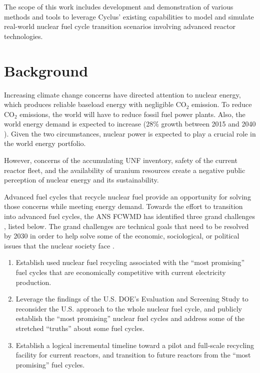 The scope of this work includes development and demonstration of
various methods and tools to leverage Cyclus' existing
capabilities to model and simulate real-world nuclear fuel cycle
transition scenarios involving advanced reactor technologies.


\section{Background}
Increasing climate change concerns have directed attention
to nuclear energy, which produces reliable baseload energy
with negligible CO$_2$ emission. To reduce CO$_2$ emissions,
the world will have to reduce fossil fuel power plants.
Also, the world energy demand is expected to increase
(28\% growth between 2015 and 2040 \cite{conti_international_2016}).
Given the two circumstances,
nuclear power is expected to play a crucial role in the world energy portfolio.

However, concerns of the accumulating \gls{UNF} inventory,
safety of the current reactor fleet, and the availability of
uranium resources create a negative public perception of
nuclear energy and its sustainability.

Advanced fuel cycles that recycle nuclear fuel 
provide an opportunity for solving those concerns while
meeting energy demand. Towards the effort to transition
into advanced fuel cycles, the \gls{ANS} \gls{FCWMD} has identified
three grand challenges \cite{huff_message_2017}, listed below. The grand
challenges are technical goals that need to be resolved by
2030 in order to help solve some of the economic, sociological,
or political issues that the nuclear society face \cite{american_nuclear_society_ans_2017}.

\begin{enumerate}
	\item Establish used nuclear fuel recycling associated with the
	``most promising'' fuel cycles that are economically competitive
	with current electricity production.
	\item Leverage the findings of the U.S. \gls{DOE}'s Evaluation
	and Screening Study to reconsider the U.S. approach to the whole
	nuclear fuel cycle, and publicly establish the ``most promising''
	nuclear fuel cycles and address some of the stretched ``truths''
	about some fuel cycles.
	\item Establish a logical incremental timeline toward a pilot
	and full-scale recycling facility for current reactors, and
	transition to future reactors from the ``most promising'' fuel cycles.
\end{enumerate}

